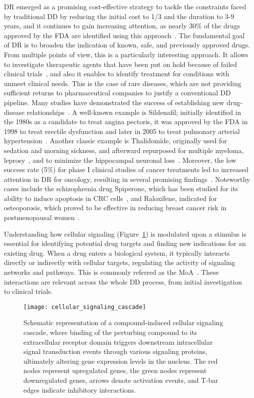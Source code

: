 \gls{DR} emerged as a promising cost-effective strategy to tackle the constraints faced by traditional \gls{DD} by reducing the initial cost to 1/3 and the duration to 3-9 years, and it continues to gain increasing attention, as nearly 30\% of the drugs approved by the FDA are identified using this approach~\cite{RN54,RN64}. 
The fundamental goal of \gls{DR} is to broaden the indication of known, safe, and previously approved drugs. 
From multiple points of view, this is a particularly interesting approach. 
It allows to investigate therapeutic agents that have been put on hold because of failed clinical trials~\cite{RN62}, and also it enables to identify treatment for conditions with unmeet clinical needs. 
This is the case of rare diseases, which are not providing sufficient returns to pharmaceutical companies to justify a conventional DD pipeline. 
Many studies have demonstrated the success of establishing new drug-disease relationships~\cite{RN48}. 
A well-known example is Sildenafil; initially identified in the 1980s as a candidate to treat angina pectoris, it was approved by the \gls{FDA} in 1998 to treat erectile dysfunction and later in 2005 to treat pulmonary arterial hypertension~\cite{RN54, RN64, RN48}. 
Another classic example is Thalidomide, originally used for sedation and morning sickness, and afterward repurposed for multiple myeloma, leprosy~\cite{RN54, RN64}, and to minimize the hippocampal neuronal loss~\cite{RN50}. Moreover, the low success rate (5\%) for phase I clinical studies of cancer treatments led to increased attention in DR for oncology, resulting in several promising findings~\cite{RN64, RN63}. 
Noteworthy cases include the schizophrenia drug Spiperone, which has been studied for its ability to induce apoptosis in \gls{CRC} cells~\cite{RN51}, and Raloxifene, indicated for osteoporosis, which proved to be effective in reducing breast cancer risk in postmenopausal women~\cite{RN64, RN61}.

Understanding how cellular signaling (Figure~\ref{fig:cellular_signaling_cascade}) is modulated upon a stimulus is essential for identifying potential drug targets and finding new indications for an existing drug. 
When a drug enters a biological system, it typically interacts directly or indirectly with cellular targets, regulating the activity of signaling networks and pathways. 
This is commonly referred as the \gls{MoA}~\cite{RN52, RN53}. These interactions are relevant across the whole \gls{DD} process, from initial investigation to clinical trials. 

\begin{figure}[htbp]
    \centering
    \texttt{[image: cellular\_signaling\_cascade]}
    \caption{Schematic representation of a compound-induced cellular signaling cascade, where binding of the perturbing compound to its extracellular receptor domain triggers downstream intracellular signal transduction events through various signaling proteins, ultimately altering gene expression levels in the nucleus. The red nodes represent upregulated genes, the green nodes represent downregulated genes, arrows denote activation events, and T-bar edges indicate inhibitory interactions.}
    \label{fig:cellular_signaling_cascade}
\end{figure}


